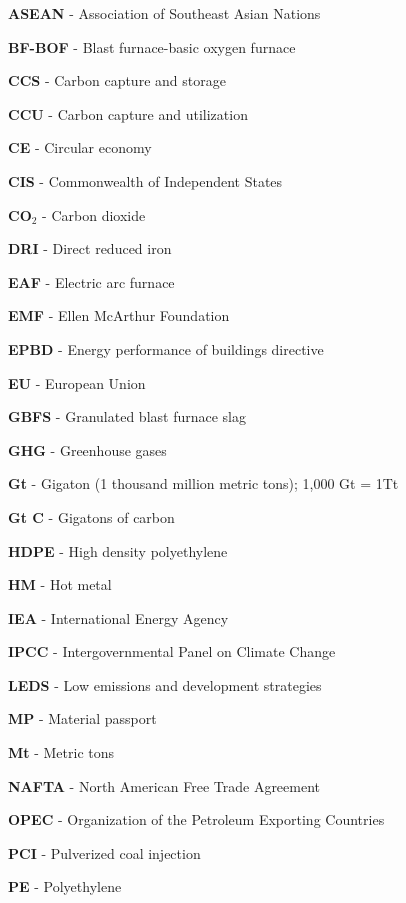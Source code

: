 \begin{scriptsize}
  \begin{myitemize}
  \item[] \textbf{ASEAN} - Association of Southeast Asian Nations
  \item[] \textbf{BF-BOF} - Blast furnace-basic oxygen furnace
  \item[] \textbf{CCS} - Carbon capture and storage
  \item[] \textbf{CCU} - Carbon capture and utilization
  \item[] \textbf{CE} - Circular economy
  \item[] \textbf{CIS} - Commonwealth of Independent States
  \item[] \textbf{CO$_2$} - Carbon dioxide
  \item[] \textbf{DRI} - Direct reduced iron
  \item[] \textbf{EAF} - Electric arc furnace
  \item[] \textbf{EMF} - Ellen McArthur Foundation
  \item[] \textbf{EPBD} - Energy performance of buildings directive
  \item[] \textbf{EU} - European Union
  \item[] \textbf{GBFS} - Granulated blast furnace slag
  \item[] \textbf{GHG} - Greenhouse gases
  \item[] \textbf{Gt} - Gigaton (1 thousand million metric tons); 1,000 Gt = 1Tt
  \item[] \textbf{Gt C} - Gigatons of carbon
  \item[] \textbf{HDPE} - High density polyethylene
  \item[] \textbf{HM} - Hot metal
  \item[] \textbf{IEA} - International Energy Agency
  \item[] \textbf{IPCC} - Intergovernmental Panel on Climate Change
  \item[] \textbf{LEDS} - Low emissions and development strategies
  \item[] \textbf{MP} - Material passport
  \item[] \textbf{Mt} - Metric tons
  \item[] \textbf{NAFTA} - North American Free Trade Agreement
  \item[] \textbf{OPEC} - Organization of the Petroleum Exporting Countries
  \item[] \textbf{PCI} - Pulverized coal injection
  \item[] \textbf{PE} - Polyethylene

\end{myitemize}
\end{scriptsize}

